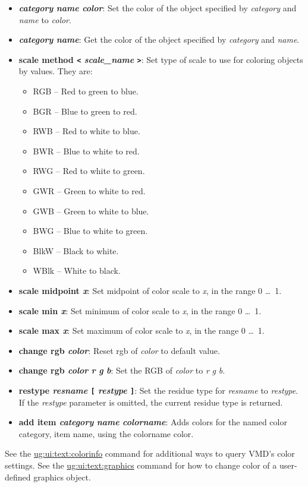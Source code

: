   \begin{itemize}
    \item {\bf {\it category} {\it name} {\it color}}: Set the color of the object specified by {\it category} and {\it name} to {\it color}.
    \item {\bf {\it category} {\it name}}: Get the color of the object specified by {\it category} and {\it name}.
    \item {\bf scale method {\tt <} {\it scale\_name} {\tt >}}: Set type of scale to use for coloring objects by values.  They are:
    \begin{itemize}
      \item  RGB  -- Red to green to blue.
      \item  BGR  -- Blue to green to red.
      \item  RWB  -- Red to white to blue.
      \item  BWR  -- Blue to white to red.
      \item  RWG  -- Red to white to green.
      \item  GWR  -- Green to white to red.
      \item  GWB  -- Green to white to blue.
      \item  BWG  -- Blue to white to green.
      \item  BlkW -- Black to white.
      \item  WBlk -- White to black.
    \end{itemize}

    \item {\bf scale midpoint {\it x}}: 
	Set midpoint of color scale to {\it x}, in the range 0 \ldots\ 1.
    \item {\bf scale min {\it x}}: 
	Set minimum of color scale to {\it x}, in the range 0 \ldots\ 1.
    \item {\bf scale max {\it x}}: 
	Set maximum of color scale to {\it x}, in the range 0 \ldots\ 1.
    \item {\bf change rgb {\it color}}: 
	Reset rgb of {\it color} to default value.
    \item {\bf change rgb {\it color} {\it r} {\it g} {\it b}}: 
	Set the RGB of {\it color} to {\it r} {\it g} {\it b}.
    \item {\bf restype {\it resname} {\tt [} {\it restype} {\tt ]}}:
        Set the residue type for {\it resname} to {\it restype}.  If
        the {\it restype} parameter is omitted, the current residue type
        is returned.
    \item {\bf add item {\it category} {\it name} {\it colorname}}:
        Adds colors for the named color category, item name, using
        the colorname color.

  \end{itemize}
See the \hyperref{colorinfo}{colorinfo \S~}{}{ug:ui:text:colorinfo} command for additional ways to query VMD's color settings. See the \hyperref{graphics}{graphics \S~}{}{ug:ui:text:graphics} command for 
how to change color of a user-defined graphics object. 

